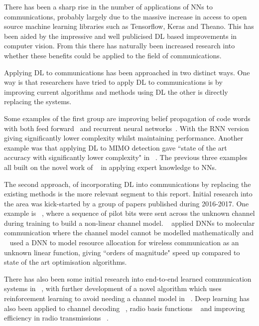 \documentclass[12pt,onecolumn,letterpaper]{article}
\begin{document}
There has been a sharp rise in the number of applications of NNs to communications, probably largely due to the massive increase in access to open source machine learning libraries such as Tensorflow, Keras and Theano. This has been aided by the impressive and well publicised DL based improvements in computer vision. From this there has naturally been increased research into whether these benefits could be applied to the field of communications.

Applying DL to communications has been approached in two distinct ways. One way is that researchers have tried to apply DL to communications is by improving current algorithms and methods using DL the other is directly replacing the systems. 

Some examples of the first group are improving belief propagation of code words with both feed forward~\cite{AppsNnBeliefPropogation} and recurrent neural networks~\cite{AppsRnnBeliefPropogation}. With the RNN version giving significantly lower complexity whilst maintaining performance. Another example was that applying DL to MIMO detection gave ``state of the art accuracy with significantly lower complexity" in ~\cite{AppsNnDeepMimoDetection}. The previous three examples all built on the novel work of ~\cite{AppsNnDeepUnfolding} in applying expert knowledge to NNs.

The second approach, of incorporating DL into communications by replacing the existing methods is the more relevant segment to this report. Initial research into the area was kick-started by a group of papers published during 2016-2017. One example is ~\cite{AppsMimoBlindDetection}, where a sequence of pilot bits were sent across the unknown channel during training to build a non-linear channel model. ~\cite{AppsMolecularComms} applied DNNs to molecular communication where the channel model cannot be modelled mathematically and ~\cite{AppsResourceAllocation} used a DNN to model resource allocation for wireless communication as an unknown linear function, giving ``orders of magnitude" speed up compared to state of the art optimisation algorithms.

There has also been some initial research into end-to-end learned communication systems in ~\cite{oShea,oShea0}, with further development of a novel algorithm which uses reinforcement learning to avoid needing a channel model in ~\cite{Aoudia}. Deep learning has also been applied to channel decoding ~\cite{AppsDlChannelDecoding}, radio basis functions ~\cite{AppsRadioBasisFunctions} and improving efficiency in radio transmissions ~\cite{AppsCnnRadioEfficiency}.
\end{document}
